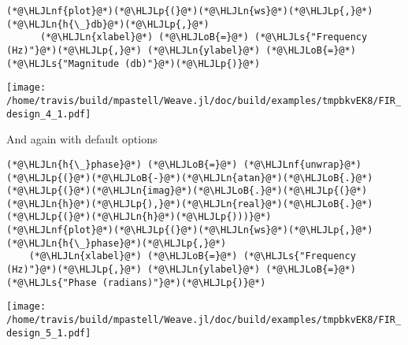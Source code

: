\documentclass[12pt,a4paper]{article}
\newcommand{\HLJLn}[1]{#1}
\newcommand{\HLJLnf}[1]{\textcolor[RGB]{66,102,213}{#1}}
\newcommand{\HLJLs}[1]{\textcolor[RGB]{201,61,57}{#1}}
\newcommand{\HLJLoB}[1]{\textcolor[RGB]{102,102,102}{\textbf{#1}}}
\newcommand{\HLJLp}[1]{#1}
\begin{document}
\begin{lstlisting}
(*@\HLJLnf{plot}@*)(*@\HLJLp{(}@*)(*@\HLJLn{ws}@*)(*@\HLJLp{,}@*) (*@\HLJLn{h{\_}db}@*)(*@\HLJLp{,}@*)
      (*@\HLJLn{xlabel}@*) (*@\HLJLoB{=}@*) (*@\HLJLs{"Frequency (Hz)"}@*)(*@\HLJLp{,}@*) (*@\HLJLn{ylabel}@*) (*@\HLJLoB{=}@*) (*@\HLJLs{"Magnitude (db)"}@*)(*@\HLJLp{)}@*)
\end{lstlisting}

\texttt{[image: /home/travis/build/mpastell/Weave.jl/doc/build/examples/tmpbkvEK8/FIR\_design\_4\_1.pdf]}

And again with default options


\begin{lstlisting}
(*@\HLJLn{h{\_}phase}@*) (*@\HLJLoB{=}@*) (*@\HLJLnf{unwrap}@*)(*@\HLJLp{(}@*)(*@\HLJLoB{-}@*)(*@\HLJLn{atan}@*)(*@\HLJLoB{.}@*)(*@\HLJLp{(}@*)(*@\HLJLn{imag}@*)(*@\HLJLoB{.}@*)(*@\HLJLp{(}@*)(*@\HLJLn{h}@*)(*@\HLJLp{),}@*)(*@\HLJLn{real}@*)(*@\HLJLoB{.}@*)(*@\HLJLp{(}@*)(*@\HLJLn{h}@*)(*@\HLJLp{)))}@*)
(*@\HLJLnf{plot}@*)(*@\HLJLp{(}@*)(*@\HLJLn{ws}@*)(*@\HLJLp{,}@*) (*@\HLJLn{h{\_}phase}@*)(*@\HLJLp{,}@*)
    (*@\HLJLn{xlabel}@*) (*@\HLJLoB{=}@*) (*@\HLJLs{"Frequency (Hz)"}@*)(*@\HLJLp{,}@*) (*@\HLJLn{ylabel}@*) (*@\HLJLoB{=}@*) (*@\HLJLs{"Phase (radians)"}@*)(*@\HLJLp{)}@*)
\end{lstlisting}

\texttt{[image: /home/travis/build/mpastell/Weave.jl/doc/build/examples/tmpbkvEK8/FIR\_design\_5\_1.pdf]}
\end{document}
